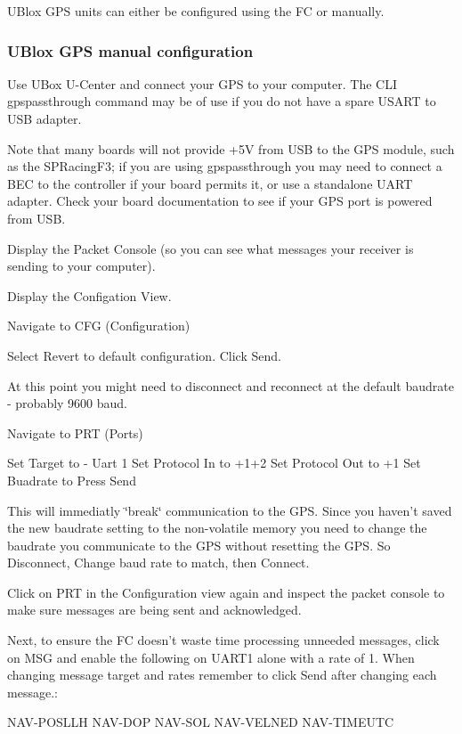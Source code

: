U\+Blox G\+P\+S units can either be configured using the F\+C or manually.

\subsubsection*{U\+Blox G\+P\+S manual configuration}

Use U\+Box U-\/\+Center and connect your G\+P\+S to your computer. The C\+L\+I {\ttfamily gpspassthrough} command may be of use if you do not have a spare U\+S\+A\+R\+T to U\+S\+B adapter.

Note that many boards will not provide +5\+V from U\+S\+B to the G\+P\+S module, such as the S\+P\+Racing\+F3; if you are using {\ttfamily gpspassthrough} you may need to connect a B\+E\+C to the controller if your board permits it, or use a standalone U\+A\+R\+T adapter. Check your board documentation to see if your G\+P\+S port is powered from U\+S\+B.

Display the Packet Console (so you can see what messages your receiver is sending to your computer).

Display the Configation View.

Navigate to C\+F\+G (Configuration)

Select {\ttfamily Revert to default configuration}. Click {\ttfamily Send}.

At this point you might need to disconnect and reconnect at the default baudrate -\/ probably 9600 baud.

Navigate to P\+R\+T (Ports)

Set {\ttfamily Target} to { -\/ Uart 1} Set {\ttfamily Protocol In} to {+1+2} Set {\ttfamily Protocol Out} to {+1} Set {\ttfamily Buadrate} to {} {} Press {\ttfamily Send}

This will immediatly \char`\"{}break\char`\"{} communication to the G\+P\+S. Since you haven't saved the new baudrate setting to the non-\/volatile memory you need to change the baudrate you communicate to the G\+P\+S without resetting the G\+P\+S. So {\ttfamily Disconnect}, Change baud rate to match, then {\ttfamily Connect}.

Click on {\ttfamily P\+R\+T} in the Configuration view again and inspect the packet console to make sure messages are being sent and acknowledged.

Next, to ensure the F\+C doesn't waste time processing unneeded messages, click on {\ttfamily M\+S\+G} and enable the following on U\+A\+R\+T1 alone with a rate of 1. When changing message target and rates remember to click {\ttfamily Send} after changing each message.\+: \begin{DoxyVerb}NAV-POSLLH
NAV-DOP
NAV-SOL
NAV-VELNED
NAV-TIMEUTC
\end{DoxyVerb}


